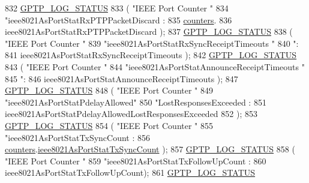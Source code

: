 \begin{DoxyCode}
{{{{{{832         \hyperlink{gptp__log_8hpp_a9bcf107d6f77d335b92bbc4825ea85a3}{GPTP\_LOG\_STATUS}
833             ( \textcolor{stringliteral}{"IEEE Port Counter "}
834               \textcolor{stringliteral}{"ieee8021AsPortStatRxPTPPacketDiscard : %
835               \hyperlink{class_common_port_aa7b0659a6104355b95878f69b0aefb69}{counters}.
836               ieee8021AsPortStatRxPTPPacketDiscard );
837         \hyperlink{gptp__log_8hpp_a9bcf107d6f77d335b92bbc4825ea85a3}{GPTP\_LOG\_STATUS}
838             ( \textcolor{stringliteral}{"IEEE Port Counter "}
839               \textcolor{stringliteral}{"ieee8021AsPortStatRxSyncReceiptTimeouts "}
840               \textcolor{stringliteral}{": %
841               ieee8021AsPortStatRxSyncReceiptTimeouts );
842         \hyperlink{gptp__log_8hpp_a9bcf107d6f77d335b92bbc4825ea85a3}{GPTP\_LOG\_STATUS}
843             ( \textcolor{stringliteral}{"IEEE Port Counter "}
844               \textcolor{stringliteral}{"ieee8021AsPortStatAnnounceReceiptTimeouts "}
845               \textcolor{stringliteral}{": %
846               ieee8021AsPortStatAnnounceReceiptTimeouts );
847         \hyperlink{gptp__log_8hpp_a9bcf107d6f77d335b92bbc4825ea85a3}{GPTP\_LOG\_STATUS}
848             ( \textcolor{stringliteral}{"IEEE Port Counter "}
849               \textcolor{stringliteral}{"ieee8021AsPortStatPdelayAllowed"}
850               \textcolor{stringliteral}{"LostResponsesExceeded : %
851               ieee8021AsPortStatPdelayAllowedLostResponsesExceeded
852                 );
853         \hyperlink{gptp__log_8hpp_a9bcf107d6f77d335b92bbc4825ea85a3}{GPTP\_LOG\_STATUS}
854             ( \textcolor{stringliteral}{"IEEE Port Counter "}
855               \textcolor{stringliteral}{"ieee8021AsPortStatTxSyncCount : %
856               \hyperlink{class_common_port_aa7b0659a6104355b95878f69b0aefb69}{counters}.\hyperlink{struct_port_counters__t_abaebe28dd0ed5e666715ddf3eb82058c}{ieee8021AsPortStatTxSyncCount} );
857         \hyperlink{gptp__log_8hpp_a9bcf107d6f77d335b92bbc4825ea85a3}{GPTP\_LOG\_STATUS}
858             ( \textcolor{stringliteral}{"IEEE Port Counter "}
859               \textcolor{stringliteral}{"ieee8021AsPortStatTxFollowUpCount : %
860               ieee8021AsPortStatTxFollowUpCount);
861         \hyperlink{gptp__log_8hpp_a9bcf107d6f77d335b92bbc4825ea85a3}{GPTP\_LOG\_STATUS}
}}}}}}}}}}}}
\end{DoxyCode}
